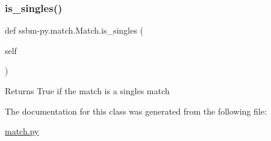 \subsubsection{\texorpdfstring{is\+\_\+singles()}{is\_singles()}}
{\footnotesize\ttfamily def ssbm-\/py.\+match.\+Match.\+is\+\_\+singles (\begin{DoxyParamCaption}\item[{}]{self }\end{DoxyParamCaption})}

\begin{DoxyVerb}Returns True if the match is a singles match \end{DoxyVerb}
 

The documentation for this class was generated from the following file\+:\begin{DoxyCompactItemize}
\item 
\hyperlink{match_8py}{match.\+py}\end{DoxyCompactItemize}
